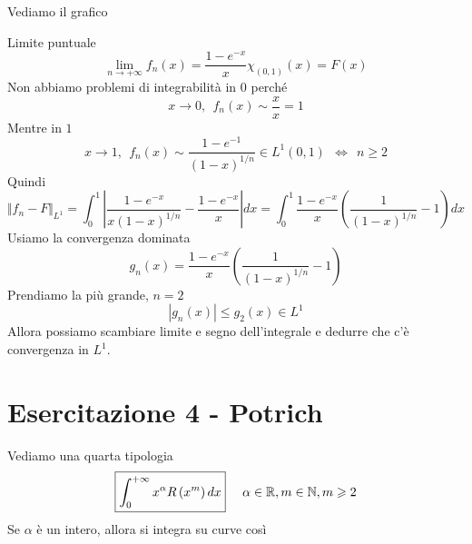 Vediamo il grafico


Limite puntuale
\begin{equation*}
\lim\limits _{n\rightarrow +\infty } f_{n}( x) =\frac{1-e^{-x}}{x} \chi _{( 0,1)} (x)=F( x)
\end{equation*}
Non abbiamo problemi di integrabilità in $0$ perché
\begin{equation*}
x\rightarrow 0,\ \ f_{n}( x) \sim \frac{x}{x} =1
\end{equation*}
Mentre in $1$
\begin{equation*}
x\rightarrow 1,\ \ f_{n}( x) \sim \frac{1-e^{-1}}{( 1-x)^{1/n}} \in L^{1}( 0,1) \ \ \iff \ \ n\geqslant 2
\end{equation*}
Quindi
\begin{equation*}
\Vert f_{n} -F\Vert _{L^{1}} =\int ^{1}_{0}\left| \frac{1-e^{-x}}{x( 1-x)^{1/n}} -\frac{1-e^{-x}}{x}\right| dx=\int ^{1}_{0}\frac{1-e^{-x}}{x}\left(\frac{1}{( 1-x)^{1/n}} -1\right) dx
\end{equation*}
Usiamo la convergenza dominata
\begin{equation*}
g_{n}( x) =\frac{1-e^{-x}}{x}\left(\frac{1}{( 1-x)^{1/n}} -1\right)
\end{equation*}
Prendiamo la più grande, $n=2$
\begin{equation*}
| g_{n}( x)| \leqslant g_{2}( x) \in L^{1}
\end{equation*}
Allora possiamo scambiare limite e segno dell'integrale e dedurre che c'è convergenza in $L^{1}$.
\chapter{Esercitazione 4 - Potrich}
\ParteEsercizi
\Esercizio{}

Vediamo una quarta tipologia
\begin{equation*}
\boxed{\int ^{+\infty }_{0} x^{\alpha } R\left( x^{m}\right) dx} \ \ \ \ \alpha \in \mathbb{R}  ,m\in \mathbb{N}  ,m\geqslant 2
\end{equation*}
Se $\alpha $ è un intero, allora si integra su curve così


